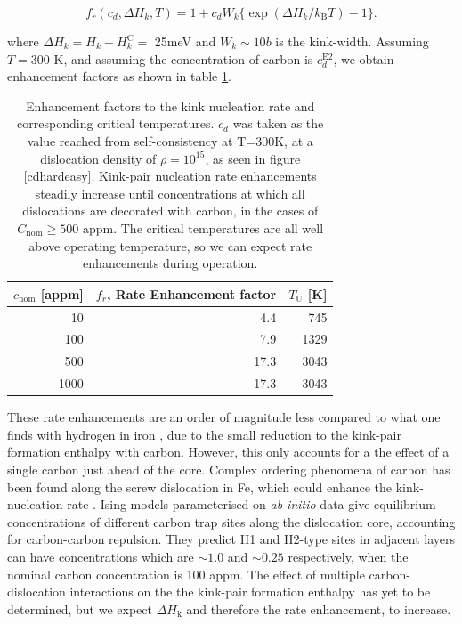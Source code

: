 \documentclass[a4paper,12pt,oneside,print,numbered,index,PageStyleIII]{PhDThesisPSnPDF}
\begin{document}
\begin{enumerate}
\begin{equation} \label{eq:enhancementfactor}
  f_r(c_d,\Delta H_{k},T) = 1 + c_d W_k \{  \exp( \Delta H_{k}/k_{\text{B}}T ) - 1 \}.
\end{equation}

where \(\Delta H_{k} = H_k - H_k^{\text{C}} =\) 25meV and \(W_k \sim 10b\) is the
kink-width. Assuming \(T=300\) K, and assuming the concentration of carbon is
\(c_d^{\text{E2}}\), we obtain enhancement factors as
shown in table \ref{rateenhancement}.


\begin{table}[htbp]
\caption{Enhancement factors to the kink nucleation rate and corresponding critical temperatures. \(c_d\) was taken as the value reached from self-consistency at T=300K, at a dislocation density of \(\rho = 10^{15}\), as seen in figure \ref{cdhardeasy}. Kink-pair nucleation rate enhancements steadily increase until concentrations at which all dislocations are decorated with carbon, in the cases of \(C_{\text{nom}} \geq 500\) appm. The critical temperatures are all well above operating temperature, so we can expect rate enhancements during operation. \label{rateenhancement}}
\centering
\begin{tabular}{rrr}
\(c_{\text{nom}}\) [appm] & \(f_r\), Rate Enhancement factor & \(T_{\text{U}}\) [K]\\
\hline
10 & 4.4 & 745\\
100 & 7.9 & 1329\\
500 & 17.3 & 3043\\
1000 & 17.3 & 3043\\
\end{tabular}
\end{table}


These rate enhancements are an order of magnitude less compared to what one finds with
hydrogen in iron \cite{Simpson2019}, due to the small reduction to the kink-pair
formation enthalpy with carbon. However, this only accounts for a the effect of a
single carbon just ahead of the core. Complex ordering phenomena of carbon has been
found along the screw dislocation in Fe, which could enhance the kink-nucleation rate
\cite{Luthi2019}. Ising models parameterised on \emph{ab-initio} data give equilibrium
concentrations of different carbon trap sites along the dislocation core, accounting
for carbon-carbon repulsion. They predict H1 and H2-type sites in adjacent
layers can have concentrations which are \(\sim 1.0\) and \(\sim 0.25\) respectively, when
the nominal carbon concentration is 100 appm. The effect of multiple
carbon-dislocation interactions on the the kink-pair formation enthalpy has yet to be
determined, but we expect \(\Delta H_{\text{k}}\) and therefore the rate enhancement, to increase.


\end{enumerate}
\end{document}
